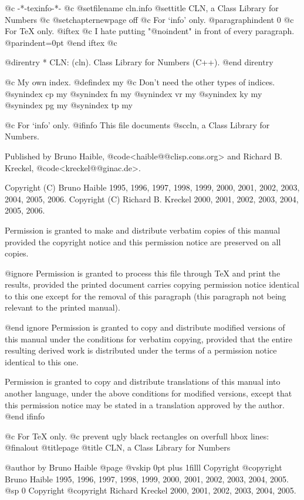   @c -*-texinfo-*-
@c %
@setfilename cln.info
@settitle CLN, a Class Library for Numbers
@c @setchapternewpage off
@c For `info' only.
@paragraphindent 0
@c For TeX only.
@iftex
@c I hate putting "@noindent" in front of every paragraph.
@parindent=0pt
@end iftex
@c %

@direntry
* CLN: (cln).                       Class Library for Numbers (C++).
@end direntry

@c My own index.
@defindex my
@c Don't need the other types of indices.
@synindex cp my
@synindex fn my
@synindex vr my
@synindex ky my
@synindex pg my
@synindex tp my


@c For `info' only.
@ifinfo
This file documents @sc{cln}, a Class Library for Numbers.

Published by Bruno Haible, @code{<haible@@clisp.cons.org>} and
Richard B. Kreckel, @code{<kreckel@@ginac.de>}.

Copyright (C)  Bruno Haible 1995, 1996, 1997, 1998, 1999, 2000, 2001, 2002, 2003, 2004, 2005, 2006.
Copyright (C)  Richard B. Kreckel 2000, 2001, 2002, 2003, 2004, 2005, 2006.

Permission is granted to make and distribute verbatim copies of
this manual provided the copyright notice and this permission notice
are preserved on all copies.

@ignore
Permission is granted to process this file through TeX and print the
results, provided the printed document carries copying permission
notice identical to this one except for the removal of this paragraph
(this paragraph not being relevant to the printed manual).

@end ignore
Permission is granted to copy and distribute modified versions of this
manual under the conditions for verbatim copying, provided that the entire
resulting derived work is distributed under the terms of a permission
notice identical to this one.

Permission is granted to copy and distribute translations of this manual
into another language, under the above conditions for modified versions,
except that this permission notice may be stated in a translation approved
by the author.
@end ifinfo


@c For TeX only.
@c prevent ugly black rectangles on overfull hbox lines:
@finalout
@titlepage
@title CLN, a Class Library for Numbers

@author by Bruno Haible
@page
@vskip 0pt plus 1filll
Copyright @copyright{} Bruno Haible 1995, 1996, 1997, 1998, 1999, 2000, 2001, 2002, 2003, 2004, 2005.
@sp 0
Copyright @copyright{} Richard Kreckel 2000, 2001, 2002, 2003, 2004, 2005.

